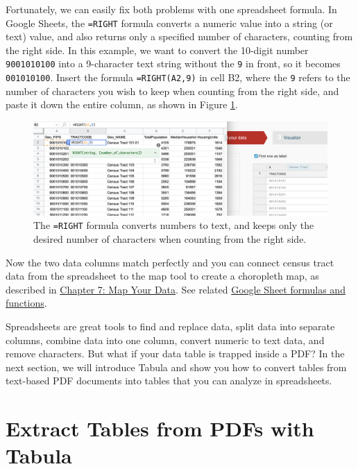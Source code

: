 \documentclass[
  english,
]{book}
\begin{document}
Fortunately, we can easily fix both problems with one spreadsheet formula. In Google Sheets, the \texttt{=RIGHT} formula converts a numeric value into a string (or text) value, and also returns only a specified number of characters, counting from the right side. In this example, we want to convert the 10-digit number \texttt{9001010100} into a 9-character text string without the \texttt{9} in front, so it becomes \texttt{001010100}. Insert the formula \texttt{=RIGHT(A2,9)} in cell B2, where the \texttt{9} refers to the number of characters you wish to keep when counting from the right side, and paste it down the entire column, as shown in Figure \ref{fig:census-code-cleaned}.



\begin{figure}
\centering
\includegraphics{images/04-clean/census-code-cleaned.png}
\caption{\label{fig:census-code-cleaned}The \texttt{=RIGHT} formula converts numbers to text, and keeps only the desired number of characters when counting from the right side.}
\end{figure}

Now the two data columns match perfectly and you can connect census tract data from the spreadsheet to the map tool to create a choropleth map, as described in \href{map.html}{Chapter 7: Map Your Data}. See related \href{https://support.google.com/docs/topic/9054603}{Google Sheet formulas and functions}.

Spreadsheets are great tools to find and replace data, split data into separate columns, combine data into one column, convert numeric to text data, and remove characters. But what if your data table is trapped inside a PDF? In the next section, we will introduce Tabula and show you how to convert tables from text-based PDF documents into tables that you can analyze in spreadsheets.

\hypertarget{tabula}{%
\section*{Extract Tables from PDFs with Tabula}\label{tabula}}
\end{document}
